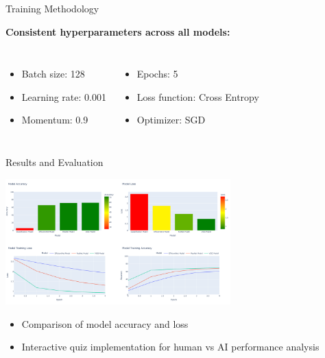 \documentclass{beamer}
\begin{document}
\begin{frame}{Training Methodology}
    \begin{center}
        \textbf{\textcolor{maincolor}{Consistent hyperparameters across all models:}}
    \end{center}
    \vspace{0.5cm}
    \begin{columns}[T]
        \begin{itemize}
            \item Batch size: 128
            \item Learning rate: 0.001
            \item Momentum: 0.9
        \end{itemize}
        
        \begin{itemize}
            \item Epochs: 5
            \item Loss function: Cross Entropy
            \item Optimizer: SGD
        \end{itemize}
    \end{columns}
\end{frame}

\begin{frame}{Results and Evaluation}
    \begin{center}
        \includegraphics[width=0.65\textwidth]{models.png}
    \end{center} 
    \begin{itemize}
        \item Comparison of model accuracy and loss
        \item Interactive quiz implementation for human vs AI performance analysis
    \end{itemize}
\end{frame}
\end{document}
